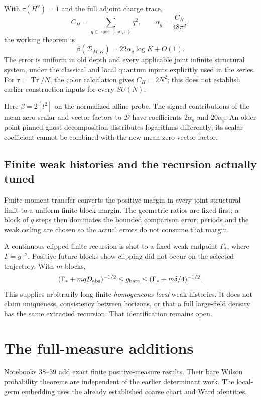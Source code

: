 \documentclass[11pt]{article}
\theoremstyle{remark}
\begin{document}
With \(\tau(H^2)=1\) and the full adjoint charge trace,
\[
 C_H=\sum_{q\in\operatorname{spec}(\operatorname{ad}_H)}q^2,
 \qquad \alpha_g=\frac{C_H}{48\pi^2},
\]
the working theorem is
\[
       \beta(\mathcal D_{M,K})=22\alpha_g\log K+O(1).
\]
The error is uniform in old depth and every applicable
joint infinite structural system, under the classical and
local quantum inputs explicitly used in the series.
For \(\tau=\operatorname{Tr}/N\), the color calculation
gives \(C_H=2N^2\); this does not establish earlier
construction inputs for every \(SU(N)\).

Here \(\beta=2[t^2]\) on the normalized affine probe.
The signed contributions of the mean-zero scalar and vector
factors to \(\mathcal D\) have coefficients
\(2\alpha_g\) and \(20\alpha_g\). An older point-pinned
ghost decomposition distributes logarithms differently;
its scalar coefficient cannot be combined with the new
mean-zero vector factor.

\subsection{Finite weak histories and the recursion actually tuned}

Finite moment transfer converts the positive margin in every
joint structural limit to a uniform finite block margin.
The geometric ratios are fixed first; a block of \(q\)
steps then dominates the bounded comparison error; periods
and the weak ceiling are chosen so the actual errors do
not consume that margin.

A continuous clipped finite recursion is shot to a fixed
weak endpoint \(\Gamma_*\), where \(\Gamma=g^{-2}\).
Positive future blocks show clipping did not occur on
the selected trajectory. With \(m\) blocks,
\[
 (\Gamma_*+mqD_{\rm abs})^{-1/2}
 \le g_{\rm bare}\le
 (\Gamma_*+m\delta/4)^{-1/2}.
\]
This supplies arbitrarily long finite \emph{homogeneous local}
weak histories. It does not claim uniqueness, consistency
between horizons, or that a full large-field density has
the same extracted recursion. That identification remains open.

\section{The full-measure additions}
\label{hdc-fullmeasure}

Notebooks 38--39 add exact finite positive-measure results.
Their bare Wilson probability theorems are independent of
the earlier determinant work. The local-germ embedding uses
the already established coarse chart and Ward identities.
\end{document}
